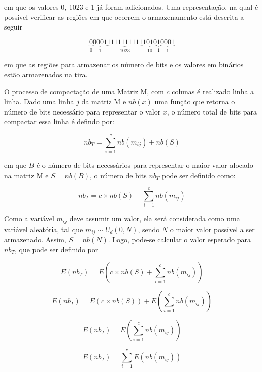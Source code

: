 \documentclass[a4paper,11pt]{article}
\begin{document}
\noindent em que os valores 0, 1023 e 1  já foram
adicionados. Uma representação, na qual é possível verificar as regiões em que
ocorrem o armazenamento está descrita a seguir

\begin{equation}
 \underbrace{0}_{0}\underbrace{0001}_{1}\underbrace{1111111111}_{1023}\underbrace{1010}_{10}\underbrace{1}_{1}\underbrace{0001}_{1}
\end{equation}

\noindent em que as regiões para armazenar os número de bits e os valores em
binários estão armazenados na tira.

O processo de compactação de uma Matriz M, com $c$ colunas é realizado linha a linha. Dado uma linha $j$ da matriz M e $nb(x)$ uma função que
retorna o número de bits necessário para representar o valor $x$, o número total de bits para
compactar essa linha é defindo por:

\begin{equation}
  nb_T = \sum_{i=1}^{c} nb(m_{ij})+ nb(S)
\end{equation}

\noindent em que $B$  é o número de bits necessários para representar o maior valor alocado na matriz M  e $S = nb(B)$, o número de bits $nb_T$ pode ser definido como:

\begin{equation}
  nb_T = c \times nb(S) + \sum_{i=1}^{c} nb(m_{ij})
\end{equation}

Como a variável $m_{ij}$ deve assumir um valor, ela será
considerada como uma variável aleatória, tal que $m_{ij}
\sim U_d(0,N)$, sendo $N$ o maior valor possível a ser armazenado.  Assim, $S =
nb(N)$. Logo, pode-se calcular o valor esperado para $nb_T$, que pode ser 
definido por

\begin{equation}
  E(nb_T) = E(c \times nb(S) + \sum_{i=1}^{c} nb(m_{ij}))
\end{equation}

\begin{equation}
  E(nb_T) = E(c \times nb(S)) + E(\sum_{i=1}^{c} nb(m_{ij}))
\end{equation}

\begin{equation}
  E(nb_T) = E(\sum_{i=1}^{c} nb(m_{ij}))
\end{equation}

\begin{equation}
  E(nb_T) = \sum_{i=1}^{c} E(nb(m_{ij}))
\end{equation}









 
\end{document}
